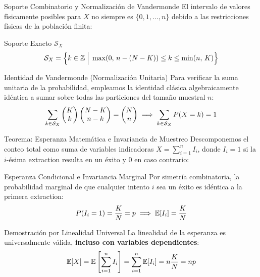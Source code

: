 \documentclass[10pt, aspectratio=169]{beamer}
\begin{document}
\begin{frame}{Soporte Combinatorio y Normalización de Vandermonde}
  \footnotesize
  El intervalo de valores físicamente posibles para $X$ no siempre es $\{0, 1, \dots, n\}$ debido a las restricciones físicas de la población finita: \pause

  \vspace{0.1cm}
  \begin{block}{Soporte Exacto $\mathcal{S}_X$}
    $$\mathcal{S}_X = \left\{ k \in \mathbb{Z} \;\Big|\; \max(0, \, n - (N - K)) \le k \le \min(n, \, K) \right\}$$
  \end{block}

  \vspace{0.1cm}
  \pause
  \begin{alertblock}{Identidad de Vandermonde (Normalización Unitaria)}
    Para verificar la suma unitaria de la probabilidad, empleamos la identidad clásica algebraicamente idéntica a sumar sobre todas las particiones del tamaño muestral $n$:
    $$\sum_{k \in \mathcal{S}_X} \begin{pmatrix} K \\ k \end{pmatrix} \begin{pmatrix} N-K \\ n-k \end{pmatrix} = \begin{pmatrix} N \\ n \end{pmatrix} \implies \sum_{k \in \mathcal{S}_X} P(X = k) = 1$$
  \end{alertblock}
\end{frame}

\begin{frame}{Teorema: Esperanza Matemática e Invariancia de Muestreo}
  \footnotesize
  Descomponemos el conteo total como suma de variables indicadoras $X = \sum_{i=1}^n I_i$, donde $I_i = 1$ si la $i$-ésima extraction resulta en un éxito y $0$ en caso contrario: \pause

  \vspace{0.1cm}
  \begin{block}{Esperanza Condicional e Invariancia Marginal}
    Por simetría combinatoria, la probabilidad marginal de que cualquier intento $i$ sea un éxito es idéntica a la primera extraction:
    $$P(I_i = 1) = \dfrac{K}{N} = p \implies \mathbb{E}[I_i] = \dfrac{K}{N}$$
  \end{block}

  \vspace{0.1cm}
  \pause
  \begin{alertblock}{Demostración por Linealidad Universal}
    La linealidad de la esperanza es universalmente válida, \textbf{incluso con variables dependientes}:
    $$\mathbb{E}[X] = \mathbb{E}\left[ \sum_{i=1}^n I_i \right] = \sum_{i=1}^n \mathbb{E}[I_i] = n \dfrac{K}{N} = np$$
  \end{alertblock}
\end{frame}
\end{document}
